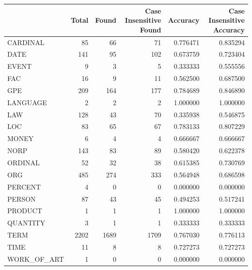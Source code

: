 \begin{tabular}{lrrrrr}
\toprule
 & Total & Found & Case Insensitive Found & Accuracy & Case Insensitive Accuracy \\
\midrule
CARDINAL & 85 & 66 & 71 & 0.776471 & 0.835294 \\
DATE & 141 & 95 & 102 & 0.673759 & 0.723404 \\
EVENT & 9 & 3 & 5 & 0.333333 & 0.555556 \\
FAC & 16 & 9 & 11 & 0.562500 & 0.687500 \\
GPE & 209 & 164 & 177 & 0.784689 & 0.846890 \\
LANGUAGE & 2 & 2 & 2 & 1.000000 & 1.000000 \\
LAW & 128 & 43 & 70 & 0.335938 & 0.546875 \\
LOC & 83 & 65 & 67 & 0.783133 & 0.807229 \\
MONEY & 6 & 4 & 4 & 0.666667 & 0.666667 \\
NORP & 143 & 83 & 89 & 0.580420 & 0.622378 \\
ORDINAL & 52 & 32 & 38 & 0.615385 & 0.730769 \\
ORG & 485 & 274 & 333 & 0.564948 & 0.686598 \\
PERCENT & 4 & 0 & 0 & 0.000000 & 0.000000 \\
PERSON & 87 & 43 & 45 & 0.494253 & 0.517241 \\
PRODUCT & 1 & 1 & 1 & 1.000000 & 1.000000 \\
QUANTITY & 3 & 1 & 1 & 0.333333 & 0.333333 \\
TERM & 2202 & 1689 & 1709 & 0.767030 & 0.776113 \\
TIME & 11 & 8 & 8 & 0.727273 & 0.727273 \\
WORK_OF_ART & 1 & 0 & 0 & 0.000000 & 0.000000 \\
\bottomrule
\end{tabular}
